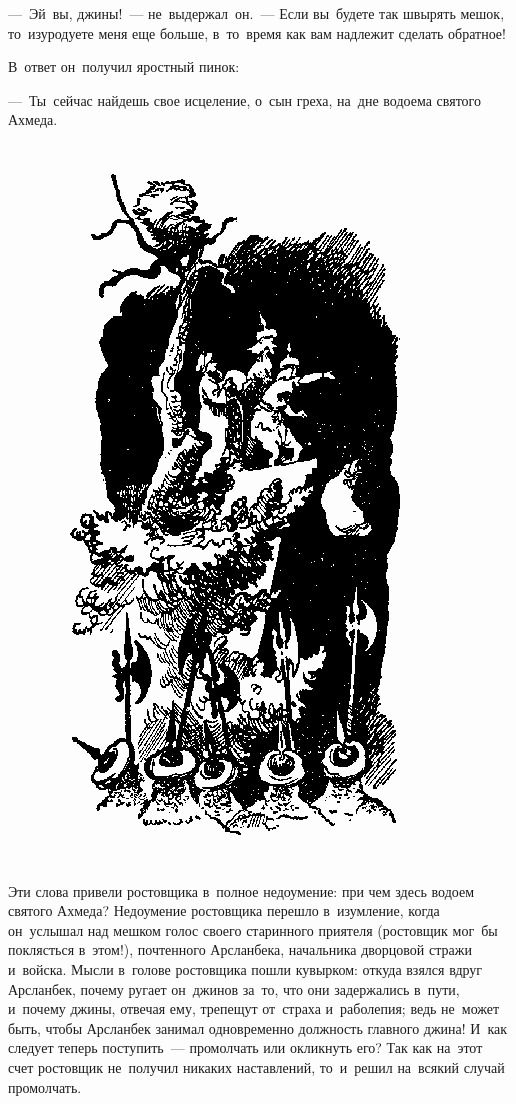 \documentclass[12pt,a4paper]{book}
\begin{document}
—~Эй~вы, джины!~— не~выдержал~он.~— Если вы~будете так швырять мешок, то~изуродуете меня еще больше, в~то~время как вам надлежит сделать обратное!

В~ответ он~получил яростный пинок:

—~Ты~сейчас найдешь свое исцеление, о~сын греха, на~дне водоема святого Ахмеда.

\begin{figure}[p]
\centering
\includegraphics[scale=0.8]{21.png}
\end{figure}

Эти слова привели ростовщика в~полное недоумение: при чем здесь водоем святого Ахмеда? Недоумение ростовщика перешло в~изумление, когда он~услышал над мешком голос своего старинного приятеля (ростовщик мог~бы поклясться в~этом!), почтенного Арсланбека, начальника дворцовой стражи и~войска. Мысли в~голове ростовщика пошли кувырком: откуда взялся вдруг Арсланбек, почему ругает он~джинов за~то, что они задержались в~пути, и~почему джины, отвечая ему, трепещут от~страха и~раболепия; ведь не~может быть, чтобы Арсланбек занимал одновременно должность главного джина! И~как следует теперь поступить~— промолчать или окликнуть его? Так как на~этот счет ростовщик не~получил никаких наставлений, то~и~решил на~всякий случай промолчать.
\end{document}
